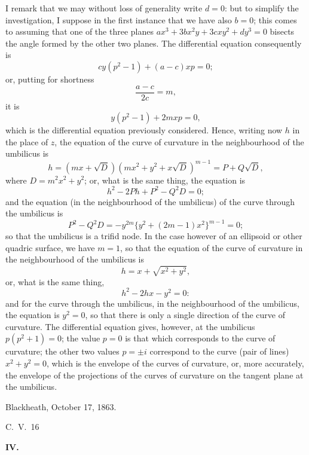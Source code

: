 \documentclass[11pt,a4paper]{article}
\begin{document}
\bigskip
\noindent I remark that we may without loss of generality write $d=0$: but to simplify the investigation, I suppose in the first instance that we have also $b=0$; this comes to assuming that one of the three planes $ax^3 + 3bx^2y + 3cxy^2 + dy^3 = 0$ bisects the angle formed by the other two planes. The differential equation consequently is
\[
cy(p^2-1) + (a-c)xp = 0;
\]
or, putting for shortness
\[
\frac{a-c}{2c} = m,
\]
it is
\[
y(p^2-1) + 2mxp = 0,
\]
which is the differential equation previously considered. Hence, writing now $h$ in the place of $z$, the equation of the curve of curvature in the neighbourhood of the umbilicus is
\[
h = (mx + \sqrt{D})(mx^2 + y^2 + x\sqrt{D})^{m-1} = P + Q\sqrt{D},
\]
where $D = m^2 x^2 + y^2$; or, what is the same thing, the equation is
\[
h^2 - 2Ph + P^2 - Q^2 D = 0;
\]
and the equation (in the neighbourhood of the umbilicus) of the curve through the umbilicus is
\[
P^2 - Q^2 D = -y^{2m}\{y^2 + (2m-1)x^2\}^{m-1} = 0;
\]
so that the umbilicus is a trifid node. In the case however of an ellipsoid or other quadric surface, we have $m=1$, so that the equation of the curve of curvature in the neighbourhood of the umbilicus is
\[
h = x + \sqrt{x^2+y^2},
\]
or, what is the same thing,
\[
h^2 - 2hx - y^2 = 0:
\]
and for the curve through the umbilicus, in the neighbourhood of the umbilicus, the equation is $y^2=0$, so that there is only a single direction of the curve of curvature. The differential equation gives, however, at the umbilicus $p(p^2+1)=0$; the value $p=0$ is that which corresponds to the curve of curvature; the other two values $p = \pm i$ correspond to the curve (pair of lines) $x^2+y^2=0$, which is the envelope of the curves of curvature, or, more accurately, the envelope of the projections of the curves of curvature on the tangent plane at the umbilicus.

\begin{flushright}
Blackheath, October 17, 1863.
\end{flushright}
\noindent C.\ V.\ 16


\bigskip
\noindent \textbf{IV.}

\medskip
\end{document}
